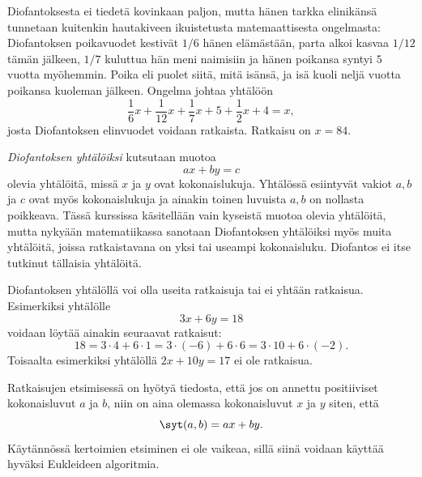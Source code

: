 Diofantoksesta ei tiedetä kovinkaan paljon, mutta hänen tarkka \hbox{elin}\-ikän\-sä tunnetaan kuitenkin hautakiveen ikuistetusta matemaattisesta ongelmasta: Diofantoksen poikavuodet kestivät $1/6$ hänen elämästään, parta alkoi kasvaa $1/12$ tämän jälkeen, $1/7$ kuluttua hän meni naimisiin ja hänen poikansa syntyi $5$ vuotta myöhemmin. Poika eli puolet siitä, mitä isänsä, ja isä kuoli neljä vuotta poikansa kuoleman jälkeen. Ongelma johtaa yhtälöön
\[
\frac{1}{6}x + \frac{1}{12} x + \frac{1}{7}x + 5 + \frac{1}{2}x+ 4=x,
\]
josta Diofantoksen elinvuodet voidaan ratkaista. Ratkaisu on $x=84$.

{\em Diofantoksen yhtälöiksi} kutsutaan muotoa
\[
ax + by = c
\]
olevia yhtälöitä, missä $x$ ja $y$ ovat kokonaislukuja. Yhtälössä esiintyvät vakiot $a,b$ ja $c$ ovat myös kokonaislukuja ja ainakin toinen luvuista $a,b$ on nollasta poikkeava. 
Tässä kurssissa käsitellään vain kyseistä muotoa olevia yhtälöitä, mutta nykyään matematiikassa sanotaan Diofantoksen yhtälöiksi myös muita yhtälöitä, joissa ratkaistavana on yksi tai useampi kokonaisluku. Diofantos ei itse tutkinut tällaisia yhtälöitä.

Diofantoksen yhtälöllä voi olla useita ratkaisuja tai ei yhtään ratkaisua. Esimerkiksi
yhtälölle
\[
3x + 6 y = 18
\]
voidaan löytää ainakin seuraavat ratkaisut:
\[
18 = 3\cdot 4 + 6\cdot 1 = 3\cdot (-6)+6\cdot 6 = 3\cdot10 + 6\cdot (-2).
\]
Toisaalta esimerkiksi yhtälöllä $2x+10 y =17$ ei ole ratkaisua.

Ratkaisujen etsimisessä on hyötyä tiedosta, että jos on annettu positiiviset kokonaisluvut $a$ ja $b$, niin on aina olemassa kokonaisluvut $x$ ja $y$ siten, että
\[
\syt(a,b) = ax + by.
\]
Käytännössä kertoimien etsiminen ei ole vaikeaa, sillä siinä voidaan käyttää hyväksi Eukleideen algoritmia.

